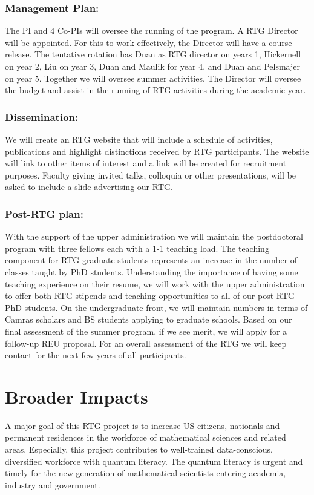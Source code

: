 \documentclass[11pt]{article}
\begin{document}
\subsubsection*{Management Plan:}
 The PI and 4 Co-PIs will oversee the running of the program. A RTG Director will be appointed. For
this to work effectively, the Director will have a course release. The tentative rotation has Duan as
RTG director on years 1, Hickernell on year 2,    Liu on year 3,    Duan and Maulik for year 4, and Duan and Pelsmajer on year 5.   Together we     will oversee summer activities. The Director will oversee
the budget and assist in the running of RTG activities during the academic year. 


 \subsubsection*{Dissemination:} 
 We will create an RTG website that will include a schedule of activities, publications and highlight
distinctions received by RTG participants. The website will link to other items of interest and a link will
be created for recruitment purposes. Faculty giving invited talks, colloquia or other presentations, will be
asked to include a slide advertising our RTG.

 
 \subsubsection*{Post-RTG plan:}
With the support of the upper administration we will maintain the postdoctoral program with three
fellows each with a 1-1 teaching load. The teaching component for RTG graduate students represents
an increase in the number of classes taught by PhD students. Understanding the importance of having
some teaching experience on their resume, we will work with the upper administration to offer both RTG
stipends and teaching opportunities to all of our post-RTG PhD students. On the undergraduate front, we
will maintain numbers in terms of Camras scholars and BS students applying to graduate schools. Based on
our final assessment of the summer program, if we see merit, we will apply for a follow-up REU proposal.
For an overall assessment of the RTG we will keep contact for the next few years of all participants.



\section{Broader Impacts} 
A major goal  of this RTG project is to increase US citizens, nationals and permanent residences in the workforce of  mathematical sciences and related areas. Especially, this project   contributes to  well-trained  data-conscious, diversified    workforce with quantum literacy.  The quantum literacy is urgent and timely for the new  generation of mathematical scientists entering academia, industry and government.
\end{document}
